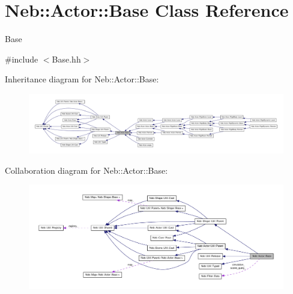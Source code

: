 \hypertarget{classNeb_1_1Actor_1_1Base}{\section{\-Neb\-:\-:\-Actor\-:\-:\-Base \-Class \-Reference}
\label{classNeb_1_1Actor_1_1Base}
}


\-Base  




{\ttfamily \#include $<$\-Base.\-hh$>$}



\-Inheritance diagram for \-Neb\-:\-:\-Actor\-:\-:\-Base\-:\nopagebreak
\begin{figure}[H]
\begin{center}
\leavevmode
\includegraphics[width=350pt]{classNeb_1_1Actor_1_1Base__inherit__graph}
\end{center}
\end{figure}


\-Collaboration diagram for \-Neb\-:\-:\-Actor\-:\-:\-Base\-:\nopagebreak
\begin{figure}[H]
\begin{center}
\leavevmode
\includegraphics[width=350pt]{classNeb_1_1Actor_1_1Base__coll__graph}
\end{center}
\end{figure}
